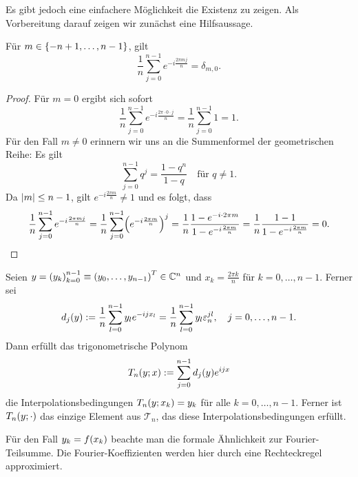 \documentclass{lecture}
\begin{document}
    Es gibt jedoch eine einfachere Möglichkeit die Existenz zu zeigen.
    Als Vorbereitung darauf zeigen wir zunächst eine Hilfsaussage.
    \begin{lemma}
        Für \(m \in \braces*{-n + 1, \ldots, n - 1}\), gilt
        \[
            \frac{1}{n}\sum_{j = 0}^{n - 1}e^{-i\frac{2\pi mj}{n}} = \delta_{m, 0}.
        \]
    \end{lemma}
    \begin{proof}
        Für \(m = 0\) ergibt sich sofort
        \[
            \frac{1}{n}\sum_{j = 0}^{n - 1}e^{-i\frac{2\pi \cdot 0 \cdot j}{n}} = \frac{1}{n}\sum_{j = 0}^{n - 1}1 = 1.
        \]
        Für den Fall \(m \ne 0\) erinnern wir uns an die Summenformel der geometrischen Reihe:
        Es gilt
        \[
            \sum_{j = 0}^{n - 1}q^j = \frac{1 - q^n}{1 - q} \quad \text{für }q \ne 1.
        \]
        Da \(\absolute*{m} \le n - 1\), gilt \(e^{-i\frac{2\pi m}{n}} \ne 1\) und es folgt, dass
        \[
            \frac{1}{n}\sum_{j = 0}^{n - 1}e^{-i\frac{2\pi mj}{n}} = \frac{1}{n}\sum_{j = 0}^{n - 1}\parentheses*{e^{-i\frac{2\pi m}{n}}}^j = \frac{1}{n}\frac{1 - e^{-i \cdot 2\pi m}}{1 - e^{-i\frac{2\pi m}{n}}} = \frac{1}{n}\frac{1 - 1}{1 - e^{-i\frac{2\pi m}{n}}} = 0.
        \]
    \end{proof}
    \begin{theorem}
        Seien \(y = \parentheses*{y_k}_{k = 0}^{n - 1} \equiv \parentheses*{y_0, \ldots, y_{n - 1}}^T \in \C^n\) und \(x_k = \frac{2\pi k}{n}\) für \(k = 0, \ldots, n - 1\).
        Ferner sei
        \[
            d_j\parentheses*{y} := \frac{1}{n}\sum_{l = 0}^{n - 1}y_l e^{-ijx_l} = \frac{1}{n}\sum_{l = 0}^{n - 1}y_l \varepsilon_n^{jl}, \quad j = 0, \ldots, n - 1.
        \]
        Dann erfüllt das trigonometrische Polynom
        \[
            T_n\parentheses*{y; x} := \sum_{j = 0}^{n - 1}d_j\parentheses*{y}e^{ijx}
        \]
        die Interpolationsbedingungen \(T_n\parentheses*{y; x_k} = y_k\) für alle \(k = 0, \ldots, n - 1\).
        Ferner ist \(T_n\parentheses*{y; \cdot}\) das einzige Element aus \(\mathcal{T}_n\), das diese Interpolationsbedingungen erfüllt.
    \end{theorem}
    \begin{remark}
        Für den Fall \(y_k = f\parentheses*{x_k}\) beachte man die formale Ähnlichkeit zur Fourier-Teilsumme.
        Die Fourier-Koeffizienten werden hier durch eine Rechteckregel approximiert.
    \end{remark}
\end{document}
